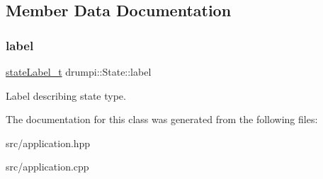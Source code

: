 \subsection{Member Data Documentation}
\mbox{\label{classdrumpi_1_1State_a6ddcdfba0e31dfb5182a7eaa6563f527}} 
\subsubsection{\texorpdfstring{label}{label}}
{\footnotesize\ttfamily \hyperlink{namespacedrumpi_af70ab0854d65f24f7fa353fdc1c46bc9}{state\+Label\+\_\+t} drumpi\+::\+State\+::label}

Label describing state type. 

The documentation for this class was generated from the following files\+:\begin{DoxyCompactItemize}
\item 
src/application.\+hpp\item 
src/application.\+cpp\end{DoxyCompactItemize}
